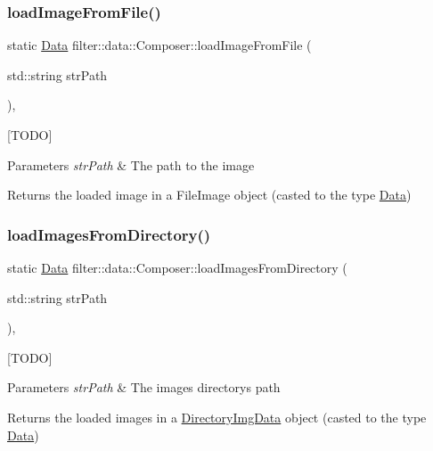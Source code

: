 \subsubsection{\texorpdfstring{load\+Image\+From\+File()}{loadImageFromFile()}}
{\footnotesize\ttfamily static \hyperlink{classfilter_1_1data_1_1_data}{Data} filter\+::data\+::\+Composer\+::load\+Image\+From\+File (\begin{DoxyParamCaption}\item[{std\+::string}]{str\+Path }\end{DoxyParamCaption})\hspace{0.3cm}{\ttfamily [inline]}, {\ttfamily [static]}}

\mbox{[}T\+O\+DO\mbox{]} 
\begin{DoxyParams}{Parameters}
{\em str\+Path} & The path to the image \\
\hline
\end{DoxyParams}
\begin{DoxyReturn}{Returns}
the loaded image in a File\+Image object (casted to the type \hyperlink{classfilter_1_1data_1_1_data}{Data}) 
\end{DoxyReturn}
\mbox{\label{classfilter_1_1data_1_1_composer_a4bbcdee91dffc1737fb71bb702ea521f}} 
\subsubsection{\texorpdfstring{load\+Images\+From\+Directory()}{loadImagesFromDirectory()}}
{\footnotesize\ttfamily static \hyperlink{classfilter_1_1data_1_1_data}{Data} filter\+::data\+::\+Composer\+::load\+Images\+From\+Directory (\begin{DoxyParamCaption}\item[{std\+::string}]{str\+Path }\end{DoxyParamCaption})\hspace{0.3cm}{\ttfamily [inline]}, {\ttfamily [static]}}

\mbox{[}T\+O\+DO\mbox{]} 
\begin{DoxyParams}{Parameters}
{\em str\+Path} & The images\textquotesingle{} directory\textquotesingle{}s path \\
\hline
\end{DoxyParams}
\begin{DoxyReturn}{Returns}
the loaded images in a \hyperlink{classfilter_1_1data_1_1_directory_img_data}{Directory\+Img\+Data} object (casted to the type \hyperlink{classfilter_1_1data_1_1_data}{Data}) 
\end{DoxyReturn}
\mbox{\label{classfilter_1_1data_1_1_composer_abd8c9f50c61149aaa0ed8c2068afd3ff}} 
